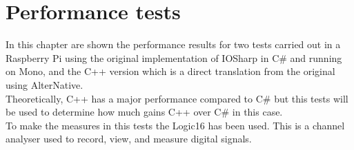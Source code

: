 \chapter{Performance tests}\label{C:Performance-Test}
In this chapter are shown the performance results for two tests carried out in a Raspberry Pi using the original implementation of IOSharp in C\# and running on Mono, and the C++ version which is a direct translation from the original using AlterNative.
\\
Theoretically, C++ has a major performance compared to C\# but this tests will be used to determine how much gains C++  over C\# in this case.
\\
To make the measures in this tests the Logic16 has been used. This is a channel analyser used to record, view, and measure digital signals.

